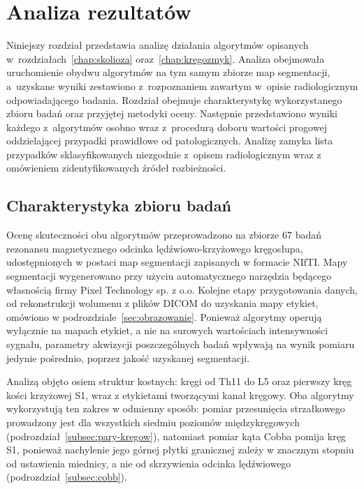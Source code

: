 \chapter{Analiza rezultatów}
\label{chap:wyniki}

Niniejszy rozdział przedstawia analizę działania algorytmów opisanych w~rozdziałach~\ref{chap:skolioza} oraz~\ref{chap:kregozmyk}.
Analiza obejmowała uruchomienie obydwu algorytmów na tym samym zbiorze map segmentacji, a~uzyskane wyniki zestawiono z~rozpoznaniem zawartym w~opisie radiologicznym odpowiadającego badania.
Rozdział obejmuje charakterystykę wykorzystanego zbioru badań oraz przyjętej metodyki oceny. Następnie przedstawiono wyniki każdego z~algorytmów osobno wraz z~procedurą doboru wartości progowej oddzielającej przypadki prawidłowe od patologicznych.
Analizę zamyka lista przypadków sklasyfikowanych niezgodnie z~opisem radiologicznym wraz z omówieniem zidentyfikowanych źródeł rozbieżności.


\section{Charakterystyka zbioru badań}
\label{sec:material}

Ocenę skuteczności obu algorytmów przeprowadzono na zbiorze 67 badań rezonansu magnetycznego odcinka lędźwiowo-krzyżowego kręgosłupa, udostępnionych w postaci map segmentacji zapisanych w formacie NIfTI.
Mapy segmentacji wygenerowano przy użyciu automatycznego narzędzia będącego własnością firmy Pixel Technology sp. z o.o.
Kolejne etapy przygotowania danych, od rekonstrukcji wolumenu z plików DICOM do uzyskania mapy etykiet, omówiono w podrozdziale~\ref{sec:obrazowanie}.
Ponieważ algorytmy operują wyłącznie na mapach etykiet, a nie na surowych wartościach intensywności sygnału, parametry akwizycji poszczególnych badań wpływają na wynik pomiaru jedynie pośrednio, poprzez jakość uzyskanej segmentacji.


Analizą objęto osiem struktur kostnych: kręgi od Th11 do L5 oraz pierwszy kręg kości krzyżowej S1, wraz z etykietami tworzącymi kanał kręgowy.
Oba algorytmy wykorzystują ten zakres w odmienny sposób: pomiar przesunięcia strzałkowego prowadzony jest dla wszystkich siedmiu poziomów międzykręgowych (podrozdział~\ref{subsec:pary-kregow}), natomiast pomiar kąta Cobba pomija kręg S1, ponieważ nachylenie jego górnej płytki granicznej zależy w znacznym stopniu od ustawienia miednicy, a nie od skrzywienia odcinka lędźwiowego (podrozdział~\ref{subsec:cobb}).

